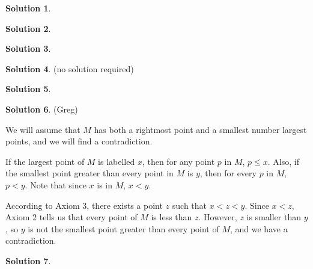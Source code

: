 \documentclass{article}
\theoremstyle{definition}
\newtheorem{solution}{Solution}
\begin{document}
\begin{solution} %
\end{solution}

\begin{solution} %
\end{solution}

\begin{solution} %
\end{solution}

\begin{solution} %
(no solution required)
\end{solution}

\begin{solution} %
\end{solution}

\begin{solution} %
(Greg)

We will assume that $M$ has both a rightmost point and a smallest number largest points, and we will find a contradiction.

If the largest point of $M$ is labelled $x$, then for any point $p$ in $M$, $p \leq x$.
Also, if the smallest point greater than every point in $M$ is $y$, then for every $p$ in $M$, $p < y$.
Note that since $x$ is in $M$, $x < y$.

According to Axiom 3, there exists a point $z$ such that $x < z < y$.
Since $x < z$, Axiom 2 tells us that every point of $M$ is less than $z$.
However, $z$ is smaller than $y$, so $y$ is not the smallest point greater than every point of $M$, and we have a contradiction.
\end{solution}

\begin{solution} %
\end{solution}
\end{document}
